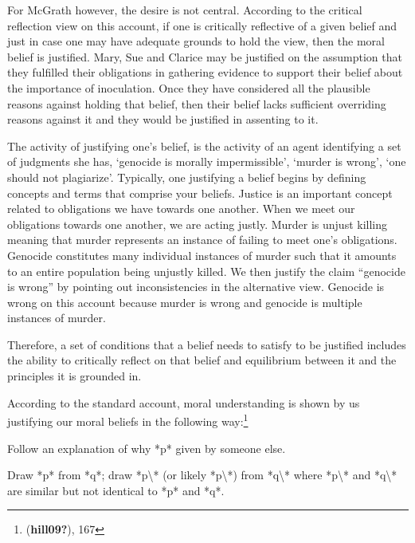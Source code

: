 \documentclass[12pt]{book}
\theoremstyle{definition}
\theoremstyle{remark}
\newcommand{\NormalTok}[1]{#1}
\newenvironment{Shaded}{}{}
\newenvironment{Highlighting}{}{}
\begin{document}
For McGrath however, the desire is not central. According to the critical reflection view on this account, if one is critically reflective of a given belief and just in case one may have adequate grounds to hold the view, then the moral belief is justified. Mary, Sue and Clarice may be justified on the assumption that they fulfilled their obligations in gathering evidence to support their belief about the importance of inoculation. Once they have considered all the plausible reasons against holding that belief, then their belief lacks sufficient overriding reasons against it and they would be justified in assenting to it.

The activity of justifying one's belief, is the activity of an agent identifying a set of judgments she has, `genocide is morally impermissible', `murder is wrong', `one should not plagiarize'. Typically, one justifying a belief begins by defining concepts and terms that comprise your beliefs. Justice is an important concept related to obligations we have towards one another. When we meet our obligations towards one another, we are acting justly. Murder is unjust killing meaning that murder represents an instance of failing to meet one's obligations. Genocide constitutes many individual instances of murder such that it amounts to an entire population being unjustly killed. We then justify the claim ``genocide is wrong'' by pointing out inconsistencies in the alternative view. Genocide is wrong on this account because murder is wrong and genocide is multiple instances of murder.

Therefore, a set of conditions that a belief needs to satisfy to be justified includes the ability to critically reflect on that belief and equilibrium between it and the principles it is grounded in.

According to the standard account, moral understanding is shown by us justifying our moral beliefs in the following way:\footnote{(\textbf{hill09?}), 167}

\begin{Shaded}
\begin{Highlighting}[]

\NormalTok{Follow an explanation of why *p* given by someone else.}
\end{Highlighting}
\end{Shaded}

\begin{Shaded}
\begin{Highlighting}[]

\NormalTok{Draw *p* from *q*; draw *p\textbackslash{}\textquotesingle{}* (or likely *p\textbackslash{}\textquotesingle{}*) from *q\textbackslash{}\textquotesingle{}* where *p\textbackslash{}\textquotesingle{}* and *q\textbackslash{}\textquotesingle{}* are similar but not identical to *p* and *q*.}
\end{Highlighting}
\end{Shaded}
\end{document}
